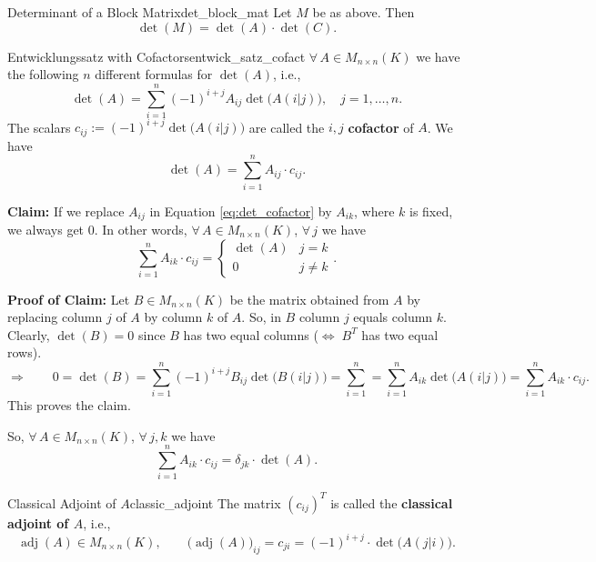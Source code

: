\begin{proposition}{Determinant of a Block Matrix}{det_block_mat}
	Let $M$ be as above. Then
	\[
		\det(M) = \det(A) \cdot \det(C).
	\]
\end{proposition}

\begin{corollary}{Entwicklungssatz with Cofactors}{entwick_satz_cofact}
	$\forall \, A \in M_{n\times n}(K)$ we have the following $n$ different formulas for $\det(A)$, i.e.,
	\[
		\det(A) = \sum_{i=1}^{n} (-1)^{i+j} A_{ij} \det\big(A(i|j)\big), \quad j = 1, \hdots, n.
	\]
	The scalars $c_{ij} := (-1)^{i+j} \det\big(A(i|j)\big)$ are called the $i, j$ \textbf{cofactor} of $A$. We have
	\begin{equation}
		\label{eq:det_cofactor}
		\det(A) = \sum_{i=1}^{n} A_{ij}\cdot c_{ij}.
	\end{equation}
\end{corollary}

\textbf{Claim:} If we replace $A_{ij}$ in Equation \eqref{eq:det_cofactor} by $A_{ik}$, where $k$ is fixed, we always get 0. In other words, $\forall \, A \in M_{n\times n}(K)$, $\forall \, j$ we have
\[
	\sum_{i=1}^{n} A_{ik} \cdot c_{ij} = \begin{cases}
		\det(A) & j = k\\
		0 & j \neq k
	\end{cases}.
\]

\textbf{Proof of Claim:} Let $B \in M_{n \times n}(K)$ be the matrix obtained from $A$ by replacing column $j$ of $A$ by column $k$ of $A$. So, in $B$ column $j$ equals column $k$. Clearly, $\det(B) = 0$ since $B$ has two equal columns ($\Longleftrightarrow \; B^T$ has two equal rows). 
\[
	\Longrightarrow \qquad 0 = \det(B) = \sum_{i=1}^{n} (-1)^{i+j} B_{ij} \det\big(B(i|j)\big)= \sum_{i=1}^{n}  = \sum_{i=1}^{n} A_{ik} \det\big(A(i|j)\big) = \sum_{i=1}^{n} A_{ik} \cdot c_{ij}.
\]
This proves the claim.

So, $\forall \, A \in M_{n\times n}(K)$, $\forall \, j,k$ we have 
\begin{equation}
	\label{eq:det_cofactor_2}
	\sum_{i=1}^{n} A_{ik} \cdot c_{ij} = \delta_{jk} \cdot \det(A).
\end{equation}

\begin{definition}{Classical Adjoint of $A$}{classic_adjoint}
	The matrix $(c_{ij})^T$ is called the \textbf{classical adjoint of $A$}, i.e.,
	\[
		\operatorname{adj}(A) \in M_{n \times n}(K), \qquad \big(\operatorname{adj}(A)\big)_{ij} = c_{ji} = (-1)^{i+j} \cdot \det\big(A(j|i)\big).
	\]
\end{definition}

